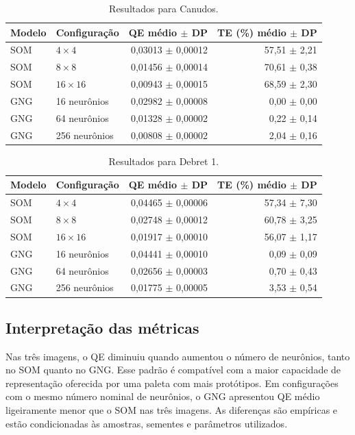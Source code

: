 \documentclass[11pt,a4paper]{article}
\begin{document}
\begin{table}[H]
\centering
\caption{Resultados para Canudos.}
\label{tab:canudos}
\small
\begin{tabular}{llrr}
\toprule
Modelo & Configuração & QE médio \(\pm\) DP & TE (\%) médio \(\pm\) DP\\
\midrule
SOM & \(4\times4\) & 0,03013 \(\pm\) 0,00012 & 57,51 \(\pm\) 2,21\\
SOM & \(8\times8\) & 0,01456 \(\pm\) 0,00014 & 70,61 \(\pm\) 0,38\\
SOM & \(16\times16\) & 0,00943 \(\pm\) 0,00015 & 68,59 \(\pm\) 2,30\\
GNG & 16 neurônios & 0,02982 \(\pm\) 0,00008 & 0,00 \(\pm\) 0,00\\
GNG & 64 neurônios & 0,01328 \(\pm\) 0,00002 & 0,22 \(\pm\) 0,14\\
GNG & 256 neurônios & 0,00808 \(\pm\) 0,00002 & 2,04 \(\pm\) 0,16\\
\bottomrule
\end{tabular}
\end{table}

\begin{table}[H]
\centering
\caption{Resultados para Debret 1.}
\label{tab:debret1}
\small
\begin{tabular}{llrr}
\toprule
Modelo & Configuração & QE médio \(\pm\) DP & TE (\%) médio \(\pm\) DP\\
\midrule
SOM & \(4\times4\) & 0,04465 \(\pm\) 0,00006 & 57,34 \(\pm\) 7,30\\
SOM & \(8\times8\) & 0,02748 \(\pm\) 0,00012 & 60,78 \(\pm\) 3,25\\
SOM & \(16\times16\) & 0,01917 \(\pm\) 0,00010 & 56,07 \(\pm\) 1,17\\
GNG & 16 neurônios & 0,04441 \(\pm\) 0,00010 & 0,09 \(\pm\) 0,09\\
GNG & 64 neurônios & 0,02656 \(\pm\) 0,00003 & 0,70 \(\pm\) 0,43\\
GNG & 256 neurônios & 0,01775 \(\pm\) 0,00005 & 3,53 \(\pm\) 0,54\\
\bottomrule
\end{tabular}
\end{table}

\subsection{Interpretação das métricas}

Nas três imagens, o QE diminuiu quando aumentou o número de neurônios, tanto
no SOM quanto no GNG. Esse padrão é compatível com a maior capacidade de
representação oferecida por uma paleta com mais protótipos. Em configurações
com o mesmo número nominal de neurônios, o GNG apresentou QE médio ligeiramente
menor que o SOM nas três imagens. As diferenças são empíricas e estão
condicionadas às amostras, sementes e parâmetros utilizados.
\end{document}
